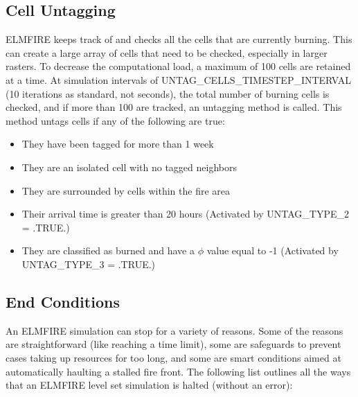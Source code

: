 \subsection{Cell Untagging}
\label{cell_untagging}

ELMFIRE keeps track of and checks all the cells that are currently burning. This can create a large array of cells that need to be checked, especially in larger rasters. To decrease the computational load, a maximum of 100 cells are retained at a time. At simulation intervals of UNTAG\_CELLS\_TIMESTEP\_INTERVAL (10 iterations as standard, not seconds), the total number of burning cells is checked, and if more than 100 are tracked, an untagging method is called. This method untags cells if any of the following are true:

\begin{itemize}
    \item They have been tagged for more than 1 week
    \item They are an isolated cell with no tagged neighbors
    \item They are surrounded by cells within the fire area
    \item Their arrival time is greater than 20 hours (Activated by UNTAG\_TYPE\_2 = .TRUE.)
    \item They are classified as burned and have a $\phi$ value equal to -1 (Activated by UNTAG\_TYPE\_3 = .TRUE.)
\end{itemize}

\subsection{End Conditions}

An ELMFIRE simulation can stop for a variety of reasons. Some of the reasons are straightforward (like reaching a time limit), some are safeguards to prevent cases taking up resources for too long, and some are smart conditions aimed at automatically haulting a stalled fire front. The following list outlines all the ways that an ELMFIRE level set simulation is halted (without an error):


